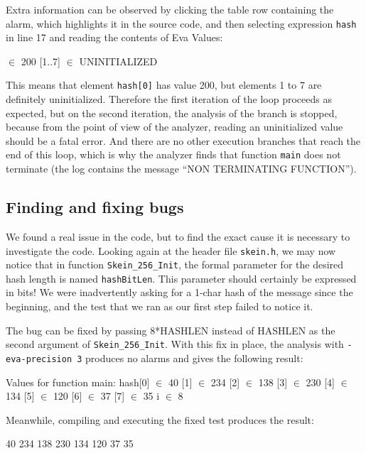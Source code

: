 \documentclass{frama-c-book}
\begin{document}
Extra information can be observed by clicking the table row containing the
alarm, which highlights it in the source code, and then selecting expression
\lstinline|hash| in line 17 and reading the contents of \textsf{Eva Values}:
\begin{logsmath}
  [0] $\in$ {200}
  [1..7] $\in$ UNINITIALIZED
\end{logsmath}
This means that element \lstinline|hash[0]| has value 200, but elements 1 to 7
are definitely uninitialized. Therefore the first iteration of the loop
proceeds as expected, but on the second iteration, the analysis of the branch
is stopped, because
from the point of view of the analyzer, reading an uninitialized
value should be a fatal error. And there are no other execution
branches that reach the end of this loop, which is why the analyzer
finds that function \lstinline|main| does not terminate (the log contains
the message ``NON TERMINATING FUNCTION'').

\subsection{Finding and fixing bugs}

We found a real issue in the code, but to find the exact cause it is necessary
to investigate the code.
Looking again at the header file \lstinline|skein.h|, we may now
notice that in function \lstinline|Skein_256_Init|,
the formal parameter for the desired hash length is named
\lstinline|hashBitLen|. This parameter should certainly be expressed in bits!
We were inadvertently asking for a 1-char hash of the message
since the beginning, and the test that we ran as our first
step failed to notice it.

The bug can be fixed by passing
8*HASHLEN instead of HASHLEN as the second argument of
\lstinline|Skein_256_Init|.
With this fix in place, the analysis
with \lstinline|-eva-precision 3| produces no alarms and gives the following
result:
\begin{logsmath}
Values for function main:
  hash[0] $\in$ {40}
      [1] $\in$ {234}
      [2] $\in$ {138}
      [3] $\in$ {230}
      [4] $\in$ {134}
      [5] $\in$ {120}
      [6] $\in$ {37}
      [7] $\in$ {35}
  i $\in$ {8}
\end{logsmath}

Meanwhile, compiling and executing the fixed test produces the result:
\begin{logsmath}
40
234
138
230
134
120
37
35
\end{logsmath}
\end{document}

